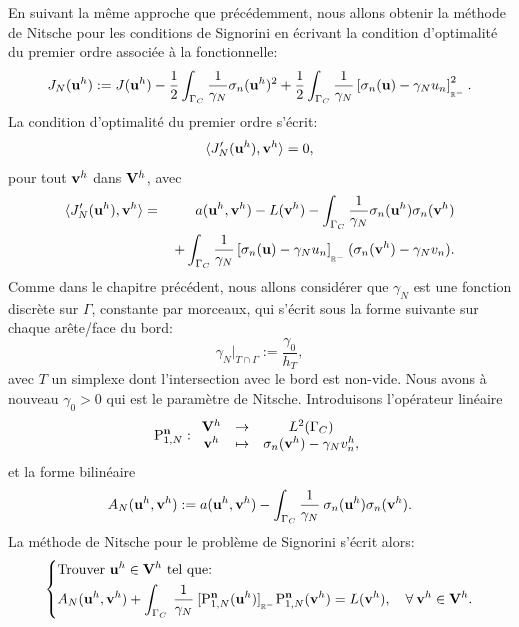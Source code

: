 \documentclass[11pt]{book}
\newcommand{\beqs}{\begin{eqnarray*}}
\newcommand{\eeqs}{\end{eqnarray*}}
\def\u{{\bf u}}
\def\t{{\bf t}}
\def\n{{\bf n}}
\def\vv{{\bf v}}
\def\V{{\bf V}}
\newcommand{\ds}{\displaystyle}
\newcommand{\R}{\mathbb{R}}
\newcommand{\Gc}{\Gamma_{C}}
\newcommand{\dg}{d\Gamma}
\newcommand{\igc}{{\ds\int_{\Gc}\hspace*{-0.7em}}}
\newcommand{\bs}{\mbox{\boldmath{$\sigma$}}}
\newcommand{\sn}{{\sigma_n}}
\newcommand{\gN}{\gamma_{N}}
\newcommand{\Agh}{A_{N}}
\newcommand{\PTgh}{\mathbf{P}^{\t}_{1, \gamma}}
\newcommand{\PTtgh}{\mathbf{P}^{\t}_{\theta, \gamma}}
\newcommand{\PNgh}{\mathrm{P}^{\n}_{1, N}}
\newcommand{\pn}[1]{\left [ #1 \right ]_{_{\R^-}}}
\begin{document}
En suivant la même approche que précédemment, nous allons obtenir la méthode de Nitsche pour les conditions de Signorini en écrivant la condition d'optimalité du premier ordre associée à la fonctionnelle:
\[
J_N (\u^h) := J(\u^h) - \frac12 \int_{\Gc} \frac1{\gamma_N} \sigma_n (\u^h)^2
+ \frac12 \int_{\Gc} \frac1{\gamma_N} \pn{ \sigma_n (\u) - \gamma_N u_n}^2.
\]
La condition d'optimalité du premier ordre s'écrit:
\[
 \langle J_N' (\u^h), \vv^h \rangle = 0,
\]
pour tout $\vv^h$ dans $\V^h$, avec
\beqs
\langle J_N' (\u^h), \vv^h \rangle%
&= \,&a ( \u^h , \vv^h ) - L( \vv^h ) 
 - \int_{\Gc} \frac1{\gamma_N} \sigma_n (\u^h) \sigma_n (\vv^h)\\
&& + \int_{\Gc} \frac1{\gamma_N} \pn{ \sigma_n (\u) - \gamma_N u_n} ( \sigma_n (\vv^h) - \gamma_N v_n).
\eeqs
Comme dans le chapitre précédent, nous allons considérer que
$\gamma_N$ est une fonction discrète sur $\Gamma$, constante par morceaux, qui s'écrit sous la forme suivante sur chaque arête/face du bord:
\[
\gN |_{T\cap\Gamma} := \frac{\gamma_0}{h_T},
\]
avec $T$ un simplexe dont l'intersection avec le bord est non-vide.
Nous avons à nouveau $\gamma_0 > 0$ qui est le paramètre de Nitsche.
Introduisons l'opérateur linéaire 
\begin{align*}
\PNgh :  
\begin{array}{ccc}
\V^h & \rightarrow & L^2(\Gc)\\
\vv^h &\mapsto& { %
\sn(\vv^h) - \gamma_N v^h_n },
\end{array}
\end{align*}
et la forme bilinéaire
\[
\Agh (\u^h,\vv^h) := 
a(\u^h,\vv^h) 
- \int_{\Gc} \frac1{\gamma_N} \:%
\sigma_n(\u^h) \sigma_n (\vv^h) .
\]
La méthode de Nitsche pour le problème de Signorini s'écrit alors:
\begin{equation} \label{fem-nitsche2}
\left\{
\begin{aligned}
&\hbox{Trouver } \u^h \in \V^h \hbox{ tel que:}\\
&\Agh (\u^h,\vv^h)
+ 
\int_{\Gc} \: \frac{1}{\gN}\:  [ \PNgh (\u^h) ]_{_{\R^-}} \PNgh (\vv^h) %
= L(\vv^h), 
\quad \forall \: \vv^h \in \V^h.
\end{aligned}
\right.
\end{equation}
\end{document}
